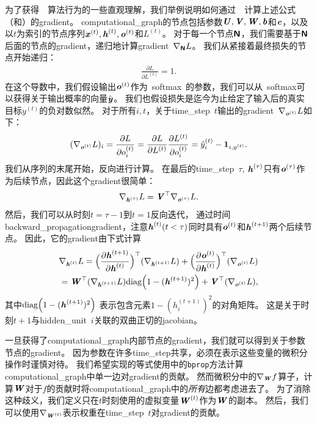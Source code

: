 为了获得~~算法行为的一些直观理解，我们举例说明如何通过~~计算上述公式（和）的\gls{gradient}。
\gls{computational_graph}的节点包括参数$\boldsymbol{\mathit{U}},\boldsymbol{\mathit{V}},\boldsymbol{\mathit{W}}, \boldsymbol{\mathit{b}}$和$\boldsymbol{\mathit{c}}$，以及以$t$为索引的节点序列$\boldsymbol{\mathit{x}}^{(t)}, \boldsymbol{\mathit{h}}^{(t)},\boldsymbol{\mathit{o}}^{(t)}$和$L^{(t)}$。
对于每一个节点$\textsf{\textbf{N}}$，我们需要基于$\textsf{\textbf{N}}$后面的节点的\gls{gradient}，递归地计算\gls{gradient}~$\nabla_{\textsf{\textbf{N}}} L$。
我们从紧接着最终损失的节点开始递归：
\begin{align}
 \frac{\partial L}{\partial L^{(t)}} = 1.
\end{align}
在这个导数中，我们假设输出$\boldsymbol{\mathit{o}}^{(t)}$作为~\gls{softmax}~的参数，我们可以从~\gls{softmax}可以获得关于输出概率的向量$\hat{\boldsymbol{\mathit{y}}}$。
我们也假设损失是迄今为止给定了输入后的真实目标$y^{(t)}$的负对数似然。
对于所有$i,t$，关于\gls{time_step}~$t$输出的\gls{gradient}~$\nabla_{\boldsymbol{\mathit{o}}^{(t)}} L$如下：
\begin{align}
 (\nabla_{\boldsymbol{\mathit{o}}^{(t)}} L)_i =  \frac{\partial L}{\partial o_i^{(t)}} 
 =  \frac{\partial L}{\partial L^{(t)}}  \frac{\partial L^{(t)}}{\partial o_i^{(t)}}  
 = \hat y_i^{(t)} - \mathbf{1}_{i,y^{(t)}}.
\end{align}
我们从序列的末尾开始，反向进行计算。
在最后的\gls{time_step}~$\tau$, $\boldsymbol{\mathit{h}}^{(\tau)}$只有$\boldsymbol{\mathit{o}}^{(\tau)}$作为后续节点，因此这个\gls{gradient}很简单：
\begin{align}
 \nabla_{\boldsymbol{\mathit{h}}^{(\tau)}} L = \boldsymbol{\mathit{V}}^\top \nabla_{\boldsymbol{\mathit{o}}^{(\tau)}} L.
\end{align}
然后，我们可以从时刻$t=\tau-1$到$t=1$反向迭代， 通过时间\gls{backward_propagation}\gls{gradient}，注意$\boldsymbol{\mathit{h}}^{(t)}(t < \tau)$同时具有$\boldsymbol{\mathit{o}}^{(t)}$和$\boldsymbol{\mathit{h}}^{(t+1)}$两个后续节点。
因此，它的\gls{gradient}由下式计算
\begin{align}
  \nabla_{\boldsymbol{\mathit{h}}^{(t)}} L = \Big( \frac{\partial \boldsymbol{\mathit{h}}^{(t+1)}}{ \partial \boldsymbol{\mathit{h}}^{(t)}}  \Big)^\top(\nabla_{\boldsymbol{\mathit{h}}^{(t+1)}} L) 
  + \Big( \frac{\partial \boldsymbol{\mathit{o}}^{(t)}}{ \partial \boldsymbol{\mathit{h}}^{(t)}}  \Big)^\top (\nabla_{\boldsymbol{\mathit{o}}^{(t)}} L) \\
  = \boldsymbol{\mathit{W}}^\top (\nabla_{\boldsymbol{\mathit{h}}^{(t+1)}} L) \text{diag} \Big( 1 - (\boldsymbol{\mathit{h}}^{(t+1)})^2 \Big) 
    + \boldsymbol{\mathit{V}}^\top ( \nabla_{\boldsymbol{\mathit{o}}^{(t)}} L ),
\end{align}
其中$\text{diag} \Big( 1 - (\boldsymbol{\mathit{h}}^{(t+1)})^2 \Big) $ 表示包含元素$1 - (h_i^{(t+1)})^2$的对角矩阵。
这是关于时刻$t+1$与\gls{hidden_unit}~$i$关联的双曲正切的\gls{jacobian}。


一旦获得了\gls{computational_graph}内部节点的\gls{gradient}，我们就可以得到关于参数节点的\gls{gradient}。
因为参数在许多\gls{time_step}共享，必须在表示这些变量的微积分操作时谨慎对待。
我们希望实现的等式使用中的{\tt bprop}方法计算\gls{computational_graph}中单一边对\gls{gradient}的贡献。
然而微积分中的$\nabla_{\boldsymbol{\mathit{W}}} f$算子，计算$\boldsymbol{\mathit{W}}$对于$f$的贡献时将\gls{computational_graph}中的\emph{所有}边都考虑进去了。
为了消除这种歧义，我们定义只在$t$时刻使用的虚拟变量$\boldsymbol{\mathit{W}}^{(t)}$作为$\boldsymbol{\mathit{W}}$的副本。
然后，我们可以使用$\nabla_{\boldsymbol{\mathit{W}}^{(t)}}$表示权重在\gls{time_step}~$t$对\gls{gradient}的贡献。

